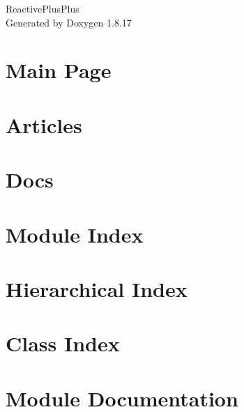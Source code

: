 \let\mypdfximage\pdfximage\def\pdfximage{\immediate\mypdfximage}\documentclass[twoside]{book}
\newcommand{\+}{\discretionary{\mbox{\scriptsize$\hookleftarrow$}}{}{}}
\newcommand{\clearemptydoublepage}{%
  \newpage{\pagestyle{empty}\cleardoublepage}%
}
\begin{document}
\hypersetup{pageanchor=false,
             bookmarksnumbered=true,
             pdfencoding=unicode
            }
\begin{titlepage}
\vspace*{7cm}
\begin{center}%
{\Large Reactive\+Plus\+Plus }\\
\vspace*{1cm}
{\large Generated by Doxygen 1.8.17}\\
\end{center}
\end{titlepage}
\clearemptydoublepage
{}
\tableofcontents
\clearemptydoublepage
{}
\hypersetup{pageanchor=true}

\chapter{Main Page}
\label{index}\hypertarget{index}{}
\chapter{Articles}
\label{md_docs__articles}

\chapter{Docs}
\label{docs}

\chapter{Module Index}

\chapter{Hierarchical Index}

\chapter{Class Index}

\chapter{Module Documentation}













\end{document}
